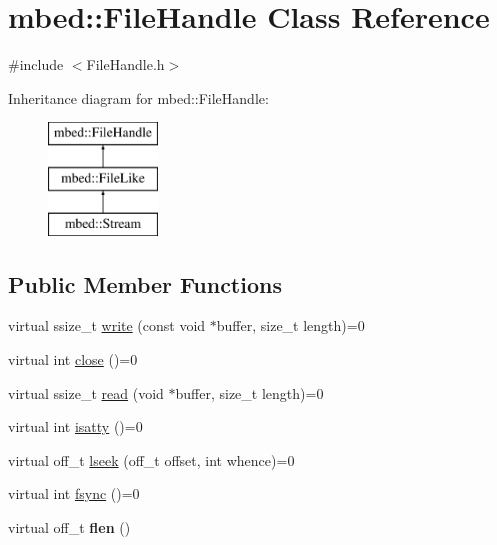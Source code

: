 \hypertarget{classmbed_1_1FileHandle}{}\section{mbed\+:\+:File\+Handle Class Reference}
\label{classmbed_1_1FileHandle}


{\ttfamily \#include $<$File\+Handle.\+h$>$}

Inheritance diagram for mbed\+:\+:File\+Handle\+:\begin{figure}[H]
\begin{center}
\leavevmode
\includegraphics[height=3.000000cm]{classmbed_1_1FileHandle}
\end{center}
\end{figure}
\subsection*{Public Member Functions}
\begin{DoxyCompactItemize}
\item 
virtual ssize\+\_\+t \hyperlink{classmbed_1_1FileHandle_afecb50bd072d06e2a56dbc4f4e68bbf5}{write} (const void $\ast$buffer, size\+\_\+t length)=0
\item 
virtual int \hyperlink{classmbed_1_1FileHandle_ac1b885028d295f74d73ff40bf6a352a2}{close} ()=0
\item 
virtual ssize\+\_\+t \hyperlink{classmbed_1_1FileHandle_ae51be2d8f51d767ba8cd8c646f211f24}{read} (void $\ast$buffer, size\+\_\+t length)=0
\item 
virtual int \hyperlink{classmbed_1_1FileHandle_a7e7936ba41fb44a4f98795fba1d92e83}{isatty} ()=0
\item 
virtual off\+\_\+t \hyperlink{classmbed_1_1FileHandle_a75046a7181de9902af9256302d57316a}{lseek} (off\+\_\+t offset, int whence)=0
\item 
virtual int \hyperlink{classmbed_1_1FileHandle_a125e7fa0507f9b935f28852ca79190b7}{fsync} ()=0
\item 
virtual off\+\_\+t {\bfseries flen} ()\hypertarget{classmbed_1_1FileHandle_a991dddade770154bd53b613b15a251a9}{}\label{classmbed_1_1FileHandle_a991dddade770154bd53b613b15a251a9}

\end{DoxyCompactItemize}


